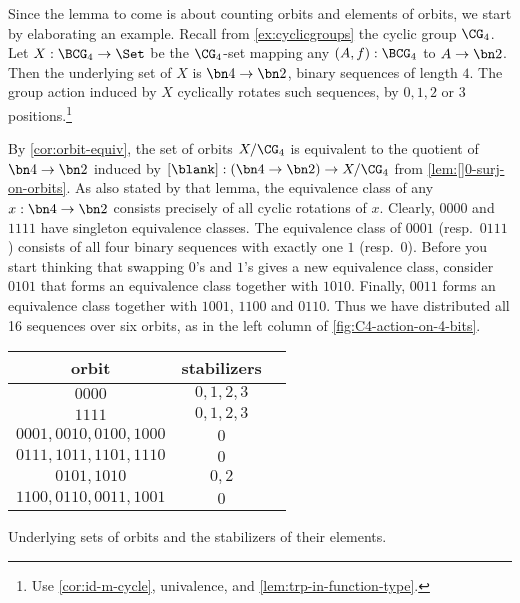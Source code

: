 \begin{example}\label{exa:prep-burnside}
Since the lemma to come is about counting orbits and
elements of orbits, we start by elaborating an example.
Recall from \cref{ex:cyclicgroups} the cyclic group $\CG_4$.
Let $X: \BCG_4\to\Set$ be the $\CG_4$-set mapping any $(A,f):\BCG_4$
to $A\to\bn2$. Then the underlying set of $X$ is $\bn4\to\bn2$,
\ie binary sequences of length $4$. The group action induced by $X$
cyclically rotates such sequences, by $0,1,2$ or $3$ positions.\footnote{%
Use \cref{cor:id-m-cycle}, univalence, and \cref{lem:trp-in-function-type}.}

By \cref{cor:orbit-equiv}, the set of orbits $X/\CG_4$ is
equivalent to the quotient of $\bn4\to\bn2$ induced by 
$[\blank] : (\bn4\to\bn2) \to X/\CG_4$ from \cref{lem:[]0-surj-on-orbits}.
As also stated by that lemma, the equivalence class of any $x:\bn4\to\bn2$
consists precisely of all cyclic rotations of $x$. Clearly, 
$0000$ and $1111$ have singleton equivalence classes.
The equivalence class of $0001$ (resp.\ $0111$) consists of all four binary 
sequences with exactly one $1$ (resp.\ $0$).  Before you start thinking that
swapping $0$'s and $1$'s gives a new equivalence class, consider 
$0101$ that forms an equivalence class together with $1010$.
Finally, $0011$ forms an equivalence class together with $1001$,
$1100$ and $0110$. Thus we have distributed all 16 sequences over
six orbits, as in the left column of \cref{fig:C4-action-on-4-bits}.

\begin{margintable}\label{fig:C4-action-on-4-bits}
  \footnotesize
\begin{tabular}{ccc} \toprule
 orbit & stabilizers \\ \midrule
 $0000$ & $0,1,2,3$ \\
 $1111$ & $0,1,2,3$ \\
 $0001,0010,0100,1000$ & $0$ \\
 $0111,1011,1101,1110$ & $0$ \\
 $0101,1010$ & $0,2$ \\
 $1100,0110,0011,1001$ & $0$ \\ \bottomrule
\end{tabular}
\caption{\label{fig:C4-action-on-4-bits}
Underlying sets of orbits and the stabilizers of their elements.}
\end{margintable}


\end{example}

